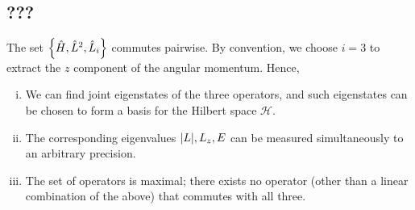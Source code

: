 \subsection{???}
The set \( \qty{ \hat H, \hat L^2, \hat L_i } \) commutes pairwise.
By convention, we choose \( i = 3 \) to extract the \( z \) component of the angular momentum.
Hence,
\begin{enumerate}[(i)]
	\item We can find joint eigenstates of the three operators, and such eigenstates can be chosen to form a basis for the Hilbert space \( \mathcal H \).
	\item The corresponding eigenvalues \( \abs{L}, L_z, E \) can be measured simultaneously to an arbitrary precision.
	\item The set of operators is maximal; there exists no operator (other than a linear combination of the above) that commutes with all three.
\end{enumerate}

